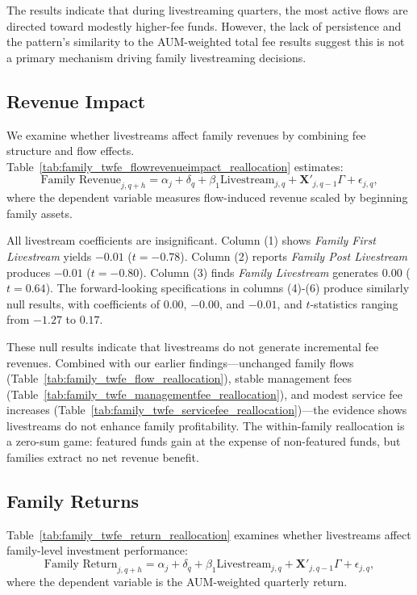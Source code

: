 \documentclass[12pt]{article}
\begin{document}
The results indicate that during livestreaming quarters, the most active flows are directed toward modestly higher-fee funds. However, the lack of persistence and the pattern's similarity to the AUM-weighted total fee results suggest this is not a primary mechanism driving family livestreaming decisions.


\subsection{Revenue Impact}\label{subsec:revenue_impact}

We examine whether livestreams affect family revenues by combining fee structure and flow effects. Table~\ref{tab:family_twfe_flowrevenueimpact_reallocation} estimates:
\begin{equation}
    \label{eq:family_revenue}
    \text{Family Revenue}_{j,q+h} = \alpha_j + \delta_q + \beta_1 \text{Livestream}_{j,q} + \mathbf{X}'_{j,q-1} \Gamma + \epsilon_{j,q},
\end{equation}
where the dependent variable measures flow-induced revenue scaled by beginning family assets.

All livestream coefficients are insignificant. Column (1) shows \textit{Family First Livestream} yields $-0.01$ ($t = -0.78$). Column (2) reports \textit{Family Post Livestream} produces $-0.01$ ($t = -0.80$). Column (3) finds \textit{Family Livestream} generates $0.00$ ($t = 0.64$). The forward-looking specifications in columns (4)-(6) produce similarly null results, with coefficients of $0.00$, $-0.00$, and $-0.01$, and $t$-statistics ranging from $-1.27$ to $0.17$. %

These null results indicate that livestreams do not generate incremental fee revenues. Combined with our earlier findings—unchanged family flows (Table~\ref{tab:family_twfe_flow_reallocation}), stable management fees (Table~\ref{tab:family_twfe_managementfee_reallocation}), and modest service fee increases (Table~\ref{tab:family_twfe_servicefee_reallocation})—the evidence shows livestreams do not enhance family profitability. The within-family reallocation is a zero-sum game: featured funds gain at the expense of non-featured funds, but families extract no net revenue benefit.

\subsection{Family Returns}\label{subsec:family_returns}

Table~\ref{tab:family_twfe_return_reallocation} examines whether livestreams affect family-level investment performance:
\begin{equation}
    \label{eq:family_return}
    \text{Family Return}_{j,q+h} = \alpha_j + \delta_q + \beta_1 \text{Livestream}_{j,q} + \mathbf{X}'_{j,q-1} \Gamma + \epsilon_{j,q},
\end{equation}
where the dependent variable is the AUM-weighted quarterly return.
\end{document}
